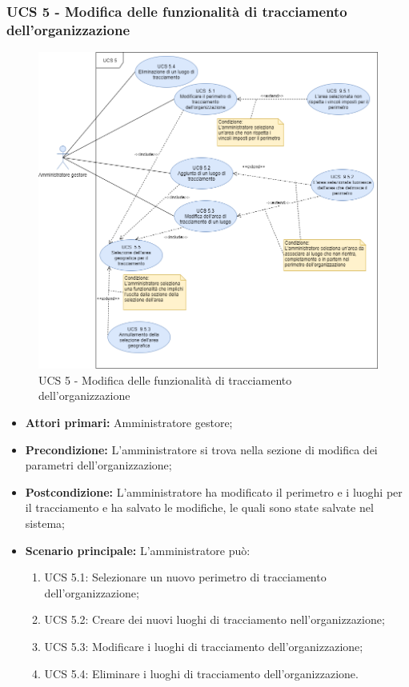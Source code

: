 \subsubsection{UCS 5 - Modifica delle funzionalità di tracciamento dell'organizzazione}%
\begin{figure}[h]
	\centering
    \includegraphics[scale=0.53]{sezioni/UseCase/Immagini/UCS5.png}
    \caption{UCS 5 - Modifica delle funzionalità di tracciamento dell'organizzazione}
\end{figure}
\begin{itemize}
    \item \textbf{Attori primari:} Amministratore gestore;
    \item \textbf{Precondizione:} L'amministratore si trova nella sezione di modifica dei parametri dell'organizzazione;
    \item \textbf{Postcondizione:} L'amministratore ha modificato il perimetro e i luoghi per il tracciamento e ha salvato le modifiche, le quali sono state salvate nel sistema;
    \item \textbf{Scenario principale:} L'amministratore può:
    \begin{enumerate}
        \item UCS 5.1: Selezionare un nuovo perimetro di tracciamento dell'organizzazione;
        \item UCS 5.2: Creare dei nuovi luoghi di tracciamento nell'organizzazione;
        \item UCS 5.3: Modificare i luoghi di tracciamento dell'organizzazione;
        \item UCS 5.4: Eliminare i luoghi di tracciamento dell'organizzazione.
    \end{enumerate}
\end{itemize}


